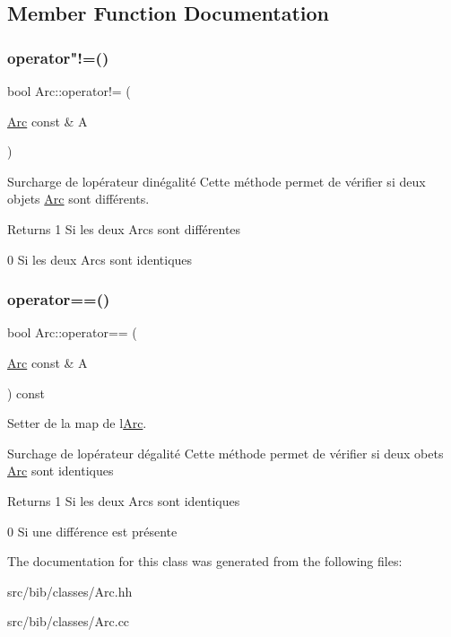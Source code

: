 \subsection{Member Function Documentation}
\mbox{\label{classArc_acf0cfb8db461ae9ae32e51542282f62a}} 
\subsubsection{\texorpdfstring{operator"!=()}{operator!=()}}
{\footnotesize\ttfamily bool Arc\+::operator!= (\begin{DoxyParamCaption}\item[{\hyperlink{classArc}{Arc} const \&}]{A }\end{DoxyParamCaption})}



Surcharge de l\textquotesingle{}op\'{e}rateur d\textquotesingle{}in\'{e}galit\'{e} Cette m\'{e}thode permet de v\'{e}rifier si deux objets \hyperlink{classArc}{Arc} sont diff\'{e}rents. 

\begin{DoxyReturn}{Returns}
1 Si les deux Arcs sont diff\'{e}rentes 

0 Si les deux Arcs sont identiques 
\end{DoxyReturn}
\mbox{\label{classArc_a1ecb11f2ae37d975195415bcd7a8c1f8}} 
\subsubsection{\texorpdfstring{operator==()}{operator==()}}
{\footnotesize\ttfamily bool Arc\+::operator== (\begin{DoxyParamCaption}\item[{\hyperlink{classArc}{Arc} const \&}]{A }\end{DoxyParamCaption}) const}



Setter de la map de l\textquotesingle{}\hyperlink{classArc}{Arc}. 

Surchage de l\textquotesingle{}op\'{e}rateur d\textquotesingle{}\'{e}galit\'{e} Cette m\'{e}thode permet de v\'{e}rifier si deux obets \hyperlink{classArc}{Arc} sont identiques \begin{DoxyReturn}{Returns}
1 Si les deux Arcs sont identiques 

0 Si une diff\'{e}rence est pr\'{e}sente 
\end{DoxyReturn}


The documentation for this class was generated from the following files\+:\begin{DoxyCompactItemize}
\item 
src/bib/classes/Arc.\+hh\item 
src/bib/classes/Arc.\+cc\end{DoxyCompactItemize}
